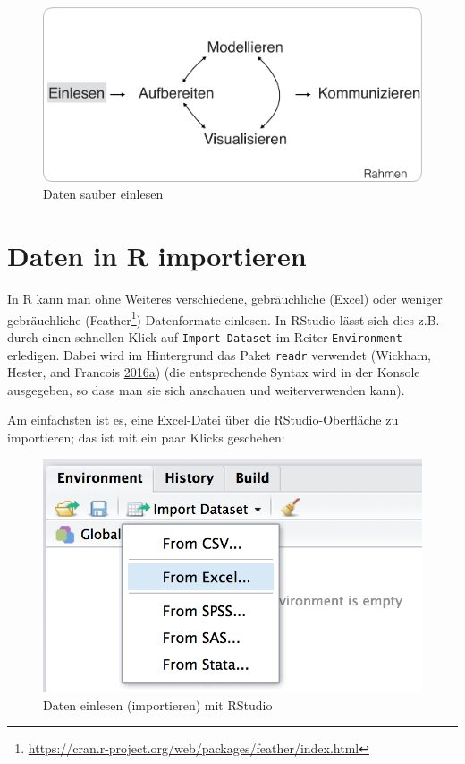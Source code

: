 \documentclass[12pt,]{book}
\let\rmarkdownfootnote\footnote%
\def\footnote{\protect\rmarkdownfootnote}
\begin{document}
\begin{figure}

{\centering \includegraphics[width=0.7\linewidth]{images/Einlesen} 

}

\caption{Daten sauber einlesen}\label{fig:step-Einlesen}
\end{figure}

\section{Daten in R importieren}\label{daten-in-r-importieren}

In R kann man ohne Weiteres verschiedene, gebräuchliche (Excel) oder
weniger gebräuchliche (Feather\footnote{\url{https://cran.r-project.org/web/packages/feather/index.html}})
Datenformate einlesen. In RStudio lässt sich dies z.B. durch einen
schnellen Klick auf \texttt{Import\ Dataset} im Reiter
\texttt{Environment} erledigen. Dabei wird im Hintergrund das Paket
\texttt{readr} verwendet (Wickham, Hester, and Francois
\protect\hyperlink{ref-readr}{2016}\protect\hyperlink{ref-readr}{a})
(die entsprechende Syntax wird in der Konsole ausgegeben, so dass man
sie sich anschauen und weiterverwenden kann).

Am einfachsten ist es, eine Excel-Datei über die RStudio-Oberfläche zu
importieren; das ist mit ein paar Klicks geschehen:

\begin{figure}

{\centering \includegraphics[width=0.5\linewidth]{images/import_RStudio} 

}

\caption{Daten einlesen (importieren) mit RStudio}\label{fig:data-import-RStudio}
\end{figure}
\end{document}
